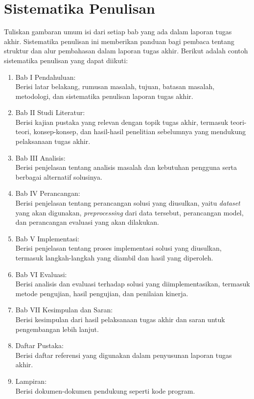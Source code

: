 \section{Sistematika Penulisan}
Tuliskan gambaran umum isi dari setiap bab yang ada dalam laporan tugas akhir. Sistematika penulisan ini memberikan panduan bagi pembaca tentang struktur dan alur pembahasan dalam laporan tugas akhir. Berikut adalah contoh sistematika penulisan yang dapat diikuti:
\begin{enumerate}
	\item	Bab I Pendahuluan: \\ Berisi latar belakang, rumusan masalah, tujuan, batasan masalah, metodologi, dan sistematika penulisan laporan tugas akhir.
	\item	Bab II Studi Literatur: \\ Berisi kajian pustaka yang relevan dengan topik tugas akhir, termasuk teori-teori, konsep-konsep, dan hasil-hasil penelitian sebelumnya yang mendukung pelaksanaan tugas akhir.
	\item	Bab III Analisis: \\ Berisi penjelasan tentang analisis masalah dan kebutuhan pengguna serta berbagai alternatif solusinya.
	\item   Bab IV Perancangan: \\ Berisi penjelasan tentang perancangan solusi yang diusulkan, yaitu \textit{dataset} yang akan digunakan, \textit{preprocessing} dari data tersebut, perancangan model, dan perancangan evaluasi yang akan dilakukan.
	\item	Bab V Implementasi: \\ Berisi penjelasan tentang proses implementasi solusi yang diusulkan, termasuk langkah-langkah yang diambil dan hasil yang diperoleh.
	\item	Bab VI Evaluasi: \\ Berisi analisis dan evaluasi terhadap solusi yang diimplementasikan, termasuk metode pengujian, hasil pengujian, dan penilaian kinerja.
	\item   Bab VII Kesimpulan dan Saran: \\ Berisi kesimpulan dari hasil pelaksanaan tugas akhir dan saran untuk pengembangan lebih lanjut.
	\item   Daftar Pustaka: \\ Berisi daftar referensi yang digunakan dalam penyusunan laporan tugas akhir.
	\item   Lampiran: \\ Berisi dokumen-dokumen pendukung seperti kode program.
\end{enumerate}